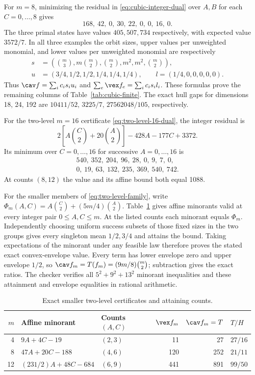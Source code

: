 For $m=8$, minimizing the residual in
\eqref{eq:cubic-integer-dual} over $A,B$ for each $C=0,\ldots,8$ gives
\[
 168,\ 42,\ 0,\ 30,\ 22,\ 0,\ 0,\ 16,\ 0.
\]
The three primal states have values $405,507,734$ respectively, with
expected value $3572/7$. In all three examples the orbit sizes, upper
values per unweighted monomial, and lower values per unweighted monomial
are respectively
\begin{align*}
 s&=\left(\binom m3,m\binom m2,\binom m2,m^2,m^2,\binom m2\right),\\
 u&=(3/4,1/2,1/2,1/4,1/4,1/4),\qquad
 l=(1/4,0,0,0,0,0).
\end{align*}
Thus $\cav f=\sum_ic_is_iu_i$ and $\sum_e\vex f_e=\sum_ic_is_il_i$.
These formulas prove the remaining columns of
Table~\ref{tab:cubic-finite}. The exact hull gaps for dimensions
18, 24, 192 are $10411/52$, $3225/7$, $27562048/105$, respectively.

For the two-level $m=16$ certificate
\eqref{eq:two-level-16-dual}, the integer residual is
\[
 2\left[A\binom C2+20\binom A2\right]-428A-177C+3372.
\]
Its minimum over $C=0,\ldots,16$ for successive $A=0,\ldots,16$ is
\[
\begin{gathered}
 540,\ 352,\ 204,\ 96,\ 28,\ 0,\ 9,\ 7,\ 0,\\
 0,\ 19,\ 63,\ 132,\ 235,\ 369,\ 540,\ 742.
\end{gathered}
\]
At counts $(8,12)$ the value and its affine bound both equal 1088.

For the smaller members of \eqref{eq:two-level-family}, write
$\Phi_m(A,C)=A\binom C2+(5m/4)\binom A2$.
Table~\ref{tab:two-level-small} gives affine minorants valid at every
integer pair $0\le A,C\le m$. At the listed counts each minorant equals
$\Phi_m$. Independently choosing uniform success subsets of those fixed
sizes in the two groups gives every singleton mean $1/2,3/4$ and attains
the bound. Taking expectations of the minorant under any feasible law
therefore proves the stated exact convex-envelope value. Every term has
lower envelope zero and upper envelope $1/2$, so
$\cav f_m=T(f_m)=(9m/8)\binom m2$; subtraction gives the exact ratios.
The checker verifies all $5^2+9^2+13^2$ minorant inequalities and these
attainment and envelope equalities in rational arithmetic.

\begin{table}[htbp]
\centering
\begin{tabular}{rllrrl}
\toprule
$m$&Affine minorant&Counts $(A,C)$&$\vex f_m$&$\cav f_m=T$&$T/H$\\\midrule
4&$9A+4C-19$&$(2,3)$&11&27&$27/16$\\
8&$47A+20C-188$&$(4,6)$&120&252&$21/11$\\
12&$(231/2)A+48C-684$&$(6,9)$&441&891&$99/50$\\\bottomrule
\end{tabular}
\caption{Exact smaller two-level certificates and attaining counts.}
\label{tab:two-level-small}
\end{table}

